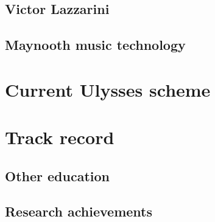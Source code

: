 \documentclass[journal,onecolumn]{IEEEtran}
\begin{document}
\subsection{Victor Lazzarini}
\subsection{Maynooth music technology}

\section{Current Ulysses scheme} %

\section{Track record}
\subsection{Other education} %

\subsection{Research achievements} %
\end{document}
